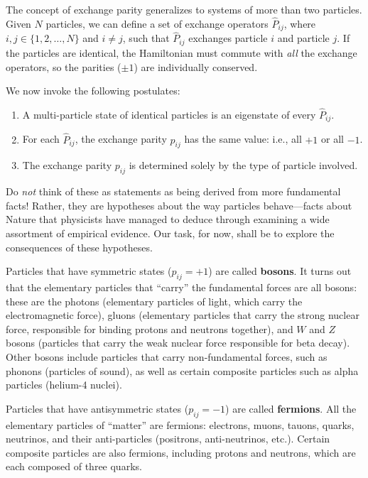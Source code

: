 \documentclass[pra,12pt]{revtex4-2}
\begin{document}
The concept of exchange parity generalizes to systems of more than two
particles.  Given $N$ particles, we can define a set of exchange
operators $\hat{P}_{ij}$, where $i,j\in\{1,2,\dots,N\}$ and $i\ne j$,
such that $\hat{P}_{ij}$ exchanges particle $i$ and particle $j$.  If
the particles are identical, the Hamiltonian must commute with
\textit{all} the exchange operators, so the parities ($\pm 1$) are
individually conserved.

We now invoke the following postulates:
\begin{enumerate}
\item A multi-particle state of identical particles is an eigenstate
  of every $\hat{P}_{ij}$.

\item For each $\hat{P}_{ij}$, the exchange parity $p_{ij}$ has the
  same value: i.e., all $+1$ or all $-1$.

\item The exchange parity $p_{ij}$ is determined solely by the type of
  particle involved.
\end{enumerate}
Do \textit{not} think of these as statements as being derived from
more fundamental facts!  Rather, they are hypotheses about the way
particles behave---facts about Nature that physicists have managed to
deduce through examining a wide assortment of empirical evidence.  Our
task, for now, shall be to explore the consequences of these
hypotheses.

Particles that have symmetric states ($p_{ij} = +1$) are called
\textbf{bosons}.  It turns out that the elementary particles that
``carry'' the fundamental forces are all bosons: these are the photons
(elementary particles of light, which carry the electromagnetic
force), gluons (elementary particles that carry the strong nuclear
force, responsible for binding protons and neutrons together), and $W$
and $Z$ bosons (particles that carry the weak nuclear force
responsible for beta decay).  Other bosons include particles that
carry non-fundamental forces, such as phonons (particles of sound), as
well as certain composite particles such as alpha particles (helium-4
nuclei).

Particles that have antisymmetric states ($p_{ij} = -1$) are called
\textbf{fermions}.  All the elementary particles of ``matter'' are
fermions: electrons, muons, tauons, quarks, neutrinos, and their
anti-particles (positrons, anti-neutrinos, etc.).  Certain composite
particles are also fermions, including protons and neutrons, which are
each composed of three quarks.
\end{document}
